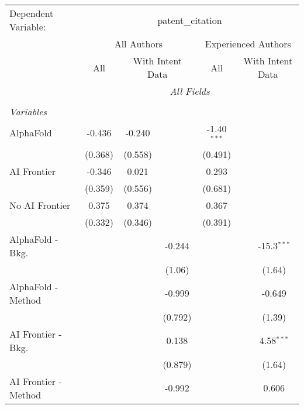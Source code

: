 \begingroup
\centering
\begin{tabular}{lcccccc}
   \tabularnewline \midrule \midrule
   Dependent Variable: & \multicolumn{6}{c}{patent\_citation}\\
 & \multicolumn{3}{c}{All Authors} & \multicolumn{3}{c}{Experienced Authors} \\
\cmidrule(lr){2-4} \cmidrule(lr){5-7}
 & \multicolumn{1}{c}{All} & \multicolumn{2}{c}{With Intent Data} & \multicolumn{1}{c}{All} & \multicolumn{2}{c}{With Intent Data} \\
\cmidrule(lr){2-2} \cmidrule(lr){3-4} \cmidrule(lr){5-5} \cmidrule(lr){6-7}
 & \multicolumn{6}{c}{\textit{All Fields}} \\ \\
   \emph{Variables}\\
   AlphaFold               & -0.436   & -0.240  &             & -1.40$^{***}$ &        &   \\   
                           & (0.368)  & (0.558) &             & (0.491)       &        &   \\   
   AI Frontier             & -0.346   & 0.021   &             & 0.293         &        &   \\   
                           & (0.359)  & (0.556) &             & (0.681)       &        &   \\   
   No AI Frontier          & 0.375    & 0.374   &             & 0.367         &        &   \\   
                           & (0.332)  & (0.346) &             & (0.391)       &        &   \\   
   AlphaFold - Bkg.        &          &         & -0.244      &               &        & -15.3$^{***}$\\   
                           &          &         & (1.06)      &               &        & (1.64)\\   
   AlphaFold - Method      &          &         & -0.999      &               &        & -0.649\\   
                           &          &         & (0.792)     &               &        & (1.39)\\   
   AI Frontier - Bkg.      &          &         & 0.138       &               &        & 4.58$^{***}$\\   
                           &          &         & (0.879)     &               &        & (1.64)\\   
   AI Frontier - Method    &          &         & -0.992      &               &        & 0.606\\   

\end{tabular}
